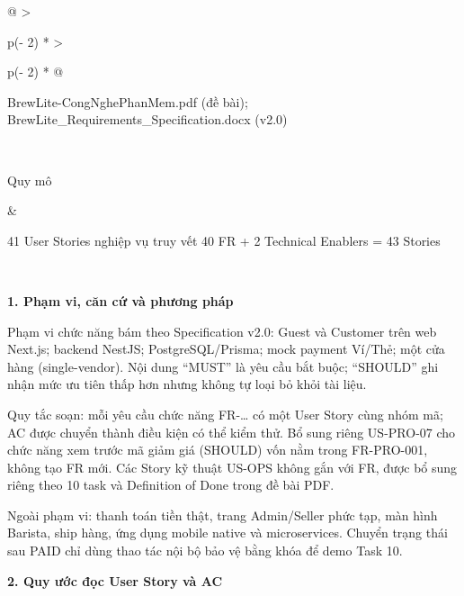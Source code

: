 \documentclass[11pt,a4paper,oneside]{report}
\begin{document}
\begin{longtable}[]{@{}
  >{\raggedright\arraybackslash}p{(\columnwidth - 2\tabcolsep) * }
  >{\raggedright\arraybackslash}p{(\columnwidth - 2\tabcolsep) * }@{}}
\begin{minipage}[b]{\linewidth}
BrewLite-CongNghePhanMem.pdf (đề bài); BrewLite\_Requirements\_Specification.docx (v2.0)
\end{minipage} \\
\begin{minipage}[b]{\linewidth}\raggedright
Quy mô
\end{minipage} & \begin{minipage}[b]{\linewidth}\raggedright
41 User Stories nghiệp vụ truy vết 40 FR + 2 Technical Enablers = 43 Stories
\end{minipage} \\
\midrule\noalign{}
\endhead
\bottomrule\noalign{}
\endlastfoot
\end{longtable}

\textbf{1. Phạm vi, căn cứ và phương pháp}

Phạm vi chức năng bám theo Specification v2.0: Guest và Customer trên web Next.js; backend NestJS; PostgreSQL/Prisma; mock payment Ví/Thẻ; một cửa hàng (single-vendor). Nội dung ``MUST'' là yêu cầu bắt buộc; ``SHOULD'' ghi nhận mức ưu tiên thấp hơn nhưng không tự loại bỏ khỏi tài liệu.

Quy tắc soạn: mỗi yêu cầu chức năng FR-\ldots{} có một User Story cùng nhóm mã; AC được chuyển thành điều kiện có thể kiểm thử. Bổ sung riêng US-PRO-07 cho chức năng xem trước mã giảm giá (SHOULD) vốn nằm trong FR-PRO-001, không tạo FR mới. Các Story kỹ thuật US-OPS không gắn với FR, được bổ sung riêng theo 10 task và Definition of Done trong đề bài PDF.

Ngoài phạm vi: thanh toán tiền thật, trang Admin/Seller phức tạp, màn hình Barista, ship hàng, ứng dụng mobile native và microservices. Chuyển trạng thái sau PAID chỉ dùng thao tác nội bộ bảo vệ bằng khóa để demo Task 10.

\textbf{2. Quy ước đọc User Story và AC}
\end{document}
